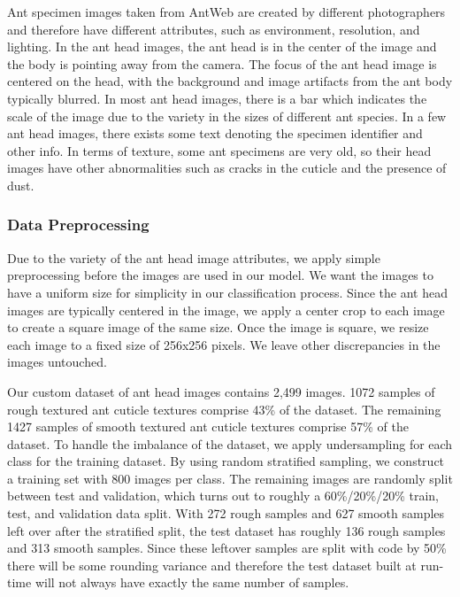 \documentclass{aci}
\numberwithin{equation}{section}
\begin{document}
Ant specimen images taken from AntWeb \cite{perrichot_antweb_2012} are created
by different photographers and therefore have different attributes, such as
environment, resolution, and lighting. In the ant head images, the ant head is
in the center of the image and the body is pointing away from the camera. The
focus of the ant head image is centered on the head, with the background and
image artifacts from the ant body typically blurred. In most ant head images,
there is a bar which indicates the scale of the image due to the variety in the
sizes of different ant species. In a few ant head images, there exists some text
denoting the specimen identifier and other info. In terms of texture, some ant
specimens are very old, so their head images have other abnormalities such as
cracks in the cuticle and the presence of dust.

\subsubsection{Data Preprocessing}

Due to the variety of the ant head image attributes, we apply simple
preprocessing before the images are used in our model. We want the images to
have a uniform size for simplicity in our classification process. Since the ant
head images are typically centered in the image, we apply a center crop to each
image to create a square image of the same size. Once the image is square, we
resize each image to a fixed size of 256x256 pixels. We leave other
discrepancies in the images untouched.

Our custom dataset of ant head images contains 2,499 images. 1072 samples of
rough textured ant cuticle textures comprise 43\% of the dataset. The remaining
1427 samples of smooth textured ant cuticle textures comprise 57\% of the
dataset. To handle the imbalance of the dataset, we apply undersampling for each
class for the training dataset. By using random stratified sampling, we
construct a training set with 800 images per class. The remaining images are
randomly split between test and validation, which turns out to roughly a
60\%/20\%/20\% train, test, and validation data split. With 272 rough samples
and 627 smooth samples left over after the stratified split, the test dataset
has roughly 136 rough samples and 313 smooth samples. Since these leftover
samples are split with code by 50\% there will be some rounding variance and
therefore the test dataset built at run-time will not always have exactly the
same number of samples.
\end{document}
